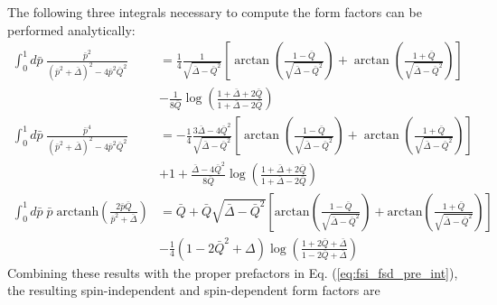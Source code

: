 \documentclass{book}[letterpaper,12pt]
\begin{document}
The following three integrals necessary to compute the form factors can be performed analytically:
\begin{equation}
\begin{split}
\int_0^1 d\bar{p}\;\frac{\bar{p}^2}{(\bar{p}^2+\bar{\Delta})^2-4\bar{p}^2\bar{Q}^2}&=\frac{1}{4}\frac{1}{\sqrt{\bar{\Delta}-\bar{Q}^2}}\left[\arctan\left(\frac{1-\bar{Q}}{\sqrt{\bar{\Delta}-\bar{Q}^2}}\right)+\arctan\left(\frac{1+\bar{Q}}{\sqrt{\bar{\Delta}-\bar{Q}^2}}\right)\right]\\
&-\frac{1}{8\bar{Q}}\log\left(\frac{1+\bar{\Delta}+2\bar{Q}}{1+\bar{\Delta}-2\bar{Q}}\right)\\
\int_0^1 d\bar{p}\;\frac{\bar{p}^4}{(\bar{p}^2+\bar{\Delta})^2-4\bar{p}^2\bar{Q}^2}&=-\frac{1}{4}\frac{3\bar{\Delta}-4\bar{Q}^2}{\sqrt{\bar{\Delta}-\bar{Q}^2}}\left[\arctan\left(\frac{1-\bar{Q}}{\sqrt{\bar{\Delta}-\bar{Q}^2}}\right)+\arctan\left(\frac{1+\bar{Q}}{\sqrt{\bar{\Delta}-\bar{Q}^2}}\right)\right]\\
&+1+\frac{\bar{\Delta}-4\bar{Q}^2}{8\bar{Q}}\log\left(\frac{1+\bar{\Delta}+2\bar{Q}}{1+\bar{\Delta}-2\bar{Q}}\right)\\
\int_0^1d\bar{p}\;\bar{p}\;\mathrm{arctanh}\left(\frac{2\bar{p}\bar{Q}}{\bar{p}^2+\bar{\Delta}}\right)&=\bar{Q}+\bar{Q}\sqrt{\bar{\Delta}-\bar{Q}^2}\left[\mathrm{arctan}\left(\frac{1-\bar{Q}}{\sqrt{\bar{\Delta}-\bar{Q}^2}}\right)+\mathrm{arctan}\left(\frac{1+\bar{Q}}{\sqrt{\bar{\Delta}-\bar{Q}^2}}\right)\right]\\
&-\frac{1}{4}\left(1-2\bar{Q}^2+\Delta\right)\log\left(\frac{1+2\bar{Q}+\bar{\Delta}}{1-2\bar{Q}+\bar{\Delta}}\right)
\end{split}
\end{equation}
Combining these results with the proper prefactors in Eq. (\ref{eq:fsi_fsd_pre_int}), the resulting spin-independent and spin-dependent form factors are 
\end{document}
